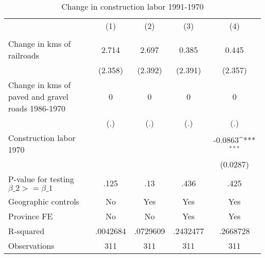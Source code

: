\begin{table}[htbp]\centering
\def\sym#1{\ifmmode^{#1}\else\(^{#1}\)\fi}
\caption{Change in construction labor 1991-1970}
\begin{tabular}{l*{4}{c}}
\hline\hline
                &\multicolumn{1}{c}{(1)}&\multicolumn{1}{c}{(2)}&\multicolumn{1}{c}{(3)}&\multicolumn{1}{c}{(4)}\\
                &\multicolumn{1}{c}{}&\multicolumn{1}{c}{}&\multicolumn{1}{c}{}&\multicolumn{1}{c}{}\\
\hline
Change in kms of railroads&    2.714         &    2.697         &    0.385         &    0.445         \\
                &  (2.358)         &  (2.392)         &  (2.391)         &  (2.357)         \\
[1em]
Change in kms of paved and gravel roads 1986-1970&        0         &        0         &        0         &        0         \\
                &      (.)         &      (.)         &      (.)         &      (.)         \\
[1em]
Construction labor 1970&                  &                  &                  &  -0.0863\sym{***}\\
                &                  &                  &                  & (0.0287)         \\
\hline
P-value for testing $\beta\_{2} >= \beta\_{1}$&     .125         &      .13         &     .436         &     .425         \\
Geographic controls&       No         &      Yes         &      Yes         &      Yes         \\
Province FE     &       No         &       No         &      Yes         &      Yes         \\
R-squared       & .0042684         & .0729609         & .2432477         & .2668728         \\
Observations    &      311         &      311         &      311         &      311         \\
\hline\hline
\end{tabular}
\end{table}
